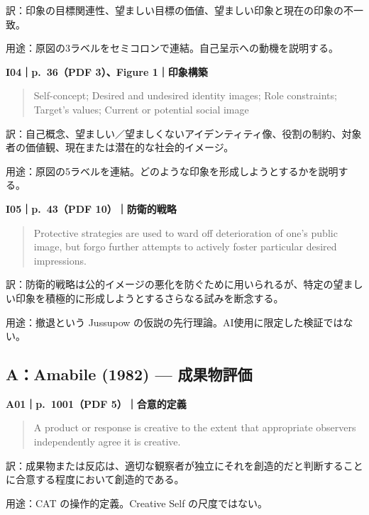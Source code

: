 \documentclass[
  11pt,
  a4paper,
]{article}
\begin{document}
訳：印象の目標関連性、望ましい目標の価値、望ましい印象と現在の印象の不一致。

用途：原図の3ラベルをセミコロンで連結。自己呈示への動機を説明する。


\textbf{I04｜p.~36（PDF 3）、Figure 1｜印象構築}

\begin{quote}
Self-concept; Desired and undesired identity images; Role constraints;
Target's values; Current or potential social image
\end{quote}

訳：自己概念、望ましい／望ましくないアイデンティティ像、役割の制約、対象者の価値観、現在または潜在的な社会的イメージ。

用途：原図の5ラベルを連結。どのような印象を形成しようとするかを説明する。


\textbf{I05｜p.~43（PDF 10）｜防衛的戦略}

\begin{quote}
Protective strategies are used to ward off deterioration of one's public
image, but forgo further attempts to actively foster particular desired
impressions.
\end{quote}

訳：防衛的戦略は公的イメージの悪化を防ぐために用いられるが、特定の望ましい印象を積極的に形成しようとするさらなる試みを断念する。

用途：撤退という Jussupow
の仮説の先行理論。AI使用に限定した検証ではない。

\subsection{A：Amabile (1982) ---
成果物評価}\label{aamabile-1982-ux6210ux679cux7269ux8a55ux4fa1}


\textbf{A01｜p.~1001（PDF 5）｜合意的定義}

\begin{quote}
A product or response is creative to the extent that appropriate
observers independently agree it is creative.
\end{quote}

訳：成果物または反応は、適切な観察者が独立にそれを創造的だと判断することに合意する程度において創造的である。

用途：CAT の操作的定義。Creative Self の尺度ではない。
\end{document}
